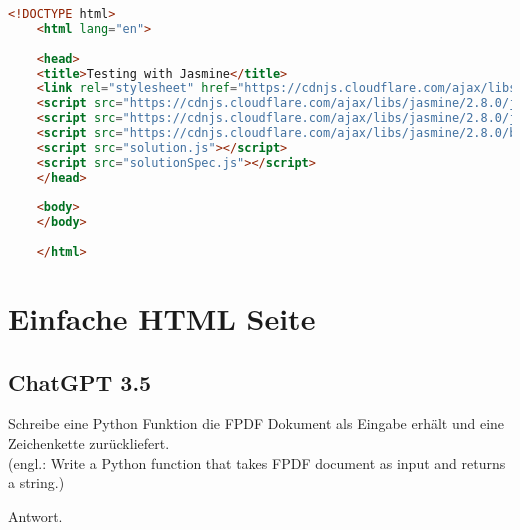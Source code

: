 \begin{lstlisting}[language=html,caption={HTML: Einbindes des Testframeworks}]
	<!DOCTYPE html>
	<html lang="en">
	
	<head>
	<title>Testing with Jasmine</title>
	<link rel="stylesheet" href="https://cdnjs.cloudflare.com/ajax/libs/jasmine/2.8.0/jasmine.min.css">
	<script src="https://cdnjs.cloudflare.com/ajax/libs/jasmine/2.8.0/jasmine.min.js"></script>
	<script src="https://cdnjs.cloudflare.com/ajax/libs/jasmine/2.8.0/jasmine-html.js"></script>
	<script src="https://cdnjs.cloudflare.com/ajax/libs/jasmine/2.8.0/boot.min.js"></script>
	<script src="solution.js"></script>
	<script src="solutionSpec.js"></script>
	</head>
	
	<body>
	</body>
	
	</html>
\end{lstlisting}

\section{Einfache HTML Seite}

\subsection{ChatGPT 3.5}


\begin{tcolorbox}[
	enhanced,
	colback=BhtColorYellow!5!white,
	colframe=BhtColorYellow!75!black,
	title= Python Funktion
]
	Schreibe eine Python Funktion die FPDF Dokument als Eingabe erhält und eine Zeichenkette zurückliefert.\\
	(engl.: Write a Python function that takes FPDF document as input and returns a string.)
\end{tcolorbox}

\begin{tcolorbox}[
	enhanced,
	colback=BhtGrey!5!white,
	colframe=BhtGrey!75!black!50,
	title= Antwort ChatGPT
	]
	Antwort.
\end{tcolorbox}

